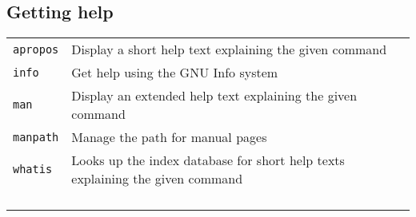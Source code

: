\documentclass[10pt]{article}
\begin{document}
\begin{multicols}{2}
\vfill

\end{multicols}

\newpage

\cheatsheet

\begin{multicols}{2}   

\section{Getting help}
\begin{tabular}{ p{2.5cm} p{8.5cm} }
  \hline
  \texttt{apropos} & Display a short help text explaining the given command \\
  \rowcolor{Gray}
  \texttt{info} & Get help using the GNU Info system \\
  \texttt{man} & Display an extended help text explaining the given command \\
  \rowcolor{Gray}
  \texttt{manpath} & Manage the path for manual pages \\
  \texttt{whatis} & Looks up the index database for short help texts explaining the given command\\
  \hline
  & \\
  & \\
  & \\
  & \\
\end{tabular}


\end{multicols}
\end{document}
